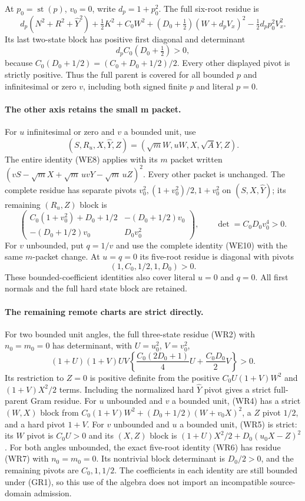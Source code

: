 At $p_0=\operatorname{st}(p)$, $v_0=0$, write $d_p=1+p_0^2$.
The full six-root residue is
\[
 d_p(N^2+R^2+\widehat Y^2)+\tfrac12K^2
 +C_0W^2+(D_0+\tfrac12)(W+d_pV_x)^2
                  -\tfrac12d_pp_0^2V_x^2.            \tag{GR3}
\]
Its last two-state block has positive first diagonal and determinant
\[
 d_p C_0(D_0+\tfrac12)>0,                            \tag{GR4}
\]
because $C_0(D_0+1/2)=(C_0+D_0+1/2)/2$.
Every other displayed pivot is strictly positive. Thus the full
parent is covered for all bounded $p$ and infinitesimal or zero $v$,
including both signed finite $p$ and literal $p=0$.

\paragraph{The other axis retains the small m packet.}
For $u$ infinitesimal or zero and $v$ a bounded unit, use
\[
 (S,R_u,X,\widehat Y,Z)=(\sqrt m W,uW,X,\sqrt A Y,Z).
\]
The entire identity (WE8) applies with its $m$ packet written
$(vS-\sqrt m X+\sqrt m\,uvY-\sqrt m\,uZ)^2$.
Every other packet is unchanged. The complete residue has separate
pivots $v_0^2,(1+v_0^2)/2,1+v_0^2$ on
$(S,X,\widehat Y)$; its remaining $(R_u,Z)$ block is
\[
 \begin{pmatrix}
 C_0(1+v_0^2)+D_0+1/2&-(D_0+1/2)v_0\\
 -(D_0+1/2)v_0&D_0v_0^2
 \end{pmatrix},\qquad \det=C_0D_0v_0^4>0.           \tag{GR5}
\]
For $v$ unbounded, put $q=1/v$ and use the complete identity
(WE10) with the same $m$-packet change. At $u=q=0$ its five-root
residue is diagonal with pivots
\[
 (1,C_0,1/2,1,D_0)>0.                              \tag{GR6}
\]
These bounded-coefficient identities also cover literal $u=0$ and
$q=0$. All first normals and the full hard state block are retained.

\paragraph{The remaining remote charts are strict directly.}
For two bounded unit angles, the full three-state residue (WR2)
with $n_0=m_0=0$ has determinant, with $U=u_0^2$, $V=v_0^2$,
\[
 (1+U)(1+V)UV\left\{
 \frac{C_0(2D_0+1)}4U+\frac{C_0D_0}2V\right\}>0.    \tag{GR7}
\]
Its restriction to $Z=0$ is positive definite from the positive
$C_0U(1+V)W^2$ and $(1+V)X^2/2$ terms. Including the normalized
hard $\widehat Y$ pivot gives a strict full-parent Gram residue.
For $u$ unbounded and $v$ a bounded unit, (WR4) has a strict
$(W,X)$ block from $C_0(1+V)W^2+(D_0+1/2)(W+v_0X)^2$,
a $Z$ pivot $1/2$, and a hard pivot $1+V$.
For $v$ unbounded and $u$ a bounded unit, (WR5) is strict:
its $W$ pivot is $C_0U>0$ and its $(X,Z)$ block is
$(1+U)X^2/2+D_0(u_0X-Z)^2$.
For both angles unbounded, the exact five-root identity (WR6)
has residue (WR7) with $n_0=m_0=0$. Its nontrivial block determinant
is $D_0/2>0$, and the remaining pivots are $C_0,1,1/2$.
The coefficients in each identity are still bounded under (GR1),
so this use of the algebra does not import an incompatible source-domain
admission.

